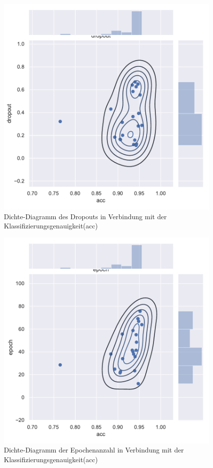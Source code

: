 \begin{figure}[H]
  \centering  
  \includegraphics[scale=0.5]{anhang/GA_50_mnist_digits_True_small_jointplot_dropout.pdf}
  \caption{Dichte-Diagramm des Dropouts in Verbindung mit der Klassifizierungsgenauigkeit(acc)}
  
\end{figure}

\begin{figure}[H]
  \centering  
  \includegraphics[scale=0.5]{anhang/GA_50_mnist_digits_True_small_jointplot_epoch.pdf}
  \caption{Dichte-Diagramm der Epochenanzahl in Verbindung mit der Klassifizierungsgenauigkeit(acc)}
  
\end{figure}

